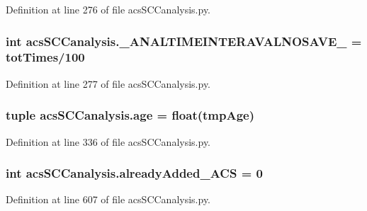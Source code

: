 Definition at line 276 of file acs\+S\+C\+Canalysis.\+py.

\hypertarget{a00130_a7665e828ed7f27f4ba353e9645ad716d}{
\subsubsection[{\+\_\+\+A\+N\+A\+L\+T\+I\+M\+E\+I\+N\+T\+E\+R\+A\+V\+A\+L\+N\+O\+S\+A\+V\+E\+\_\+}]{\setlength{\rightskip}{0pt plus 5cm}int acs\+S\+C\+Canalysis.\+\_\+\+A\+N\+A\+L\+T\+I\+M\+E\+I\+N\+T\+E\+R\+A\+V\+A\+L\+N\+O\+S\+A\+V\+E\+\_\+ = {\bf tot\+Times}/100}}\label{a00130_a7665e828ed7f27f4ba353e9645ad716d}


Definition at line 277 of file acs\+S\+C\+Canalysis.\+py.

\hypertarget{a00130_a98baad82b74a27e8b8c58aa985b7d374}{
\subsubsection[{age}]{\setlength{\rightskip}{0pt plus 5cm}tuple acs\+S\+C\+Canalysis.\+age = float(tmp\+Age)}}\label{a00130_a98baad82b74a27e8b8c58aa985b7d374}


Definition at line 336 of file acs\+S\+C\+Canalysis.\+py.

\hypertarget{a00130_a38f20e6b1cad6a61f1c9b87b37c76f63}{
\subsubsection[{already\+Added\+\_\+\+A\+C\+S}]{\setlength{\rightskip}{0pt plus 5cm}int acs\+S\+C\+Canalysis.\+already\+Added\+\_\+\+A\+C\+S = 0}}\label{a00130_a38f20e6b1cad6a61f1c9b87b37c76f63}


Definition at line 607 of file acs\+S\+C\+Canalysis.\+py.

